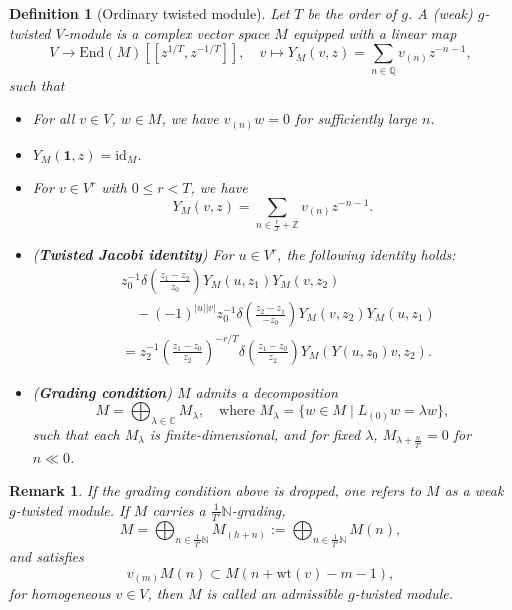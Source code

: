 \documentclass[9pt]{amsart}
\newtheorem{definition}{Definition}[section]
\newtheorem{remark}{Remark}[section]
\begin{document}
\begin{definition}[Ordinary twisted module]\label{4.7}
Let \( T \) be the order of \( g \). A (weak) \( g \)-twisted \( V \)-module is a complex vector space \( M \) equipped with a linear map
\[
V \to \mathrm{End}(M)[[z^{1/T}, z^{-1/T}]], \quad v \mapsto Y_M(v,z) = \sum_{n \in \mathbb{Q}} v_{(n)} z^{-n-1},
\]
such that
\begin{itemize}
    \item For all \( v \in V \), \( w \in M \), we have \( v_{(n)} w = 0 \) for sufficiently large \( n \).
    \item \( Y_M(\mathbf{1}, z) = \mathrm{id}_M \).
    \item For \( v \in V^r \) with \( 0 \leq r < T \), we have
    \[
    Y_M(v, z) = \sum_{n \in \frac{r}{T} + \mathbb{Z}} v_{(n)} z^{-n-1}.
    \]
    \item (\textbf{Twisted Jacobi identity}) For \( u \in V^r \), the following identity holds:
\begin{align*}
    & z_0^{-1} \delta\left( \frac{z_1 - z_2}{z_0} \right) Y_M(u, z_1) Y_M(v, z_2) \\
    &\quad - (-1)^{|u||v|} z_0^{-1} \delta\left( \frac{z_2 - z_1}{-z_0} \right) Y_M(v, z_2) Y_M(u, z_1) \\
    &= z_2^{-1} \left( \frac{z_1 - z_0}{z_2} \right)^{-r/T} 
    \delta\left( \frac{z_1 - z_0}{z_2} \right) 
    Y_M(Y(u, z_0)v, z_2).
\end{align*}
    \item (\textbf{Grading condition}) \( M \) admits a decomposition
    \[
    M = \bigoplus_{\lambda \in \mathbb{C}} M_\lambda, \quad \text{where } M_\lambda = \{ w \in M \mid L_{(0)} w = \lambda w \},
    \]
    such that each \( M_\lambda \) is finite-dimensional, and for fixed \( \lambda \), \( M_{\lambda + \frac{n}{T'}} = 0 \) for \( n \ll 0 \).
\end{itemize}
\end{definition}

\begin{remark}\label{4.8}
If the grading condition above is dropped, one refers to \( M \) as a weak \( g \)-twisted module. If \( M \) carries a \( \tfrac{1}{T'} \mathbb{N} \)-grading,
\[
M = \bigoplus_{n \in \tfrac{1}{T'} \mathbb{N}} M_{(h+n)} := \bigoplus_{n \in \tfrac{1}{T'} \mathbb{N}} M(n),
\]
and satisfies
\[
v_{(m)} M(n) \subset M(n + \mathrm{wt}(v) - m - 1),
\]
for homogeneous \( v \in V \), then \( M \) is called an admissible \( g \)-twisted module. 
\end{remark}
\end{document}
